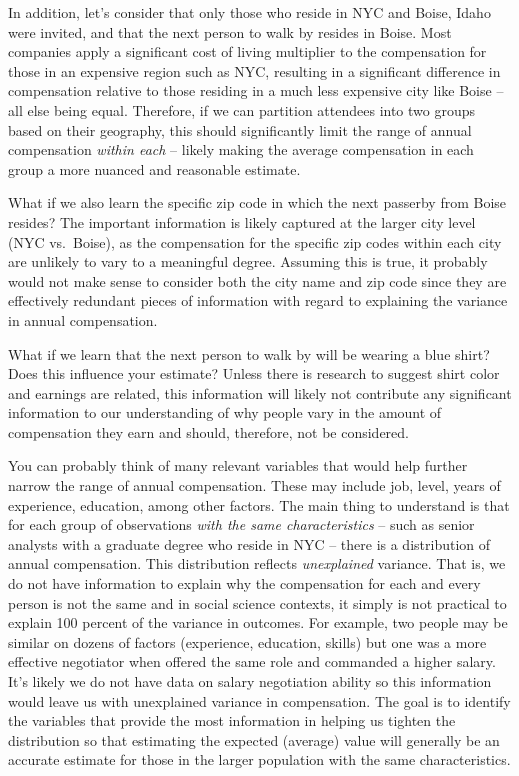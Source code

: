 \documentclass[
]{book}
\begin{document}
In addition, let's consider that only those who reside in NYC and Boise, Idaho were invited, and that the next person to walk by resides in Boise. Most companies apply a significant cost of living multiplier to the compensation for those in an expensive region such as NYC, resulting in a significant difference in compensation relative to those residing in a much less expensive city like Boise -- all else being equal. Therefore, if we can partition attendees into two groups based on their geography, this should significantly limit the range of annual compensation \emph{within each} -- likely making the average compensation in each group a more nuanced and reasonable estimate.

What if we also learn the specific zip code in which the next passerby from Boise resides? The important information is likely captured at the larger city level (NYC vs.~Boise), as the compensation for the specific zip codes within each city are unlikely to vary to a meaningful degree. Assuming this is true, it probably would not make sense to consider both the city name and zip code since they are effectively redundant pieces of information with regard to explaining the variance in annual compensation.

What if we learn that the next person to walk by will be wearing a blue shirt? Does this influence your estimate? Unless there is research to suggest shirt color and earnings are related, this information will likely not contribute any significant information to our understanding of why people vary in the amount of compensation they earn and should, therefore, not be considered.

You can probably think of many relevant variables that would help further narrow the range of annual compensation. These may include job, level, years of experience, education, among other factors. The main thing to understand is that for each group of observations \emph{with the same characteristics} -- such as senior analysts with a graduate degree who reside in NYC -- there is a distribution of annual compensation. This distribution reflects \emph{unexplained} variance. That is, we do not have information to explain why the compensation for each and every person is not the same and in social science contexts, it simply is not practical to explain 100 percent of the variance in outcomes. For example, two people may be similar on dozens of factors (experience, education, skills) but one was a more effective negotiator when offered the same role and commanded a higher salary. It's likely we do not have data on salary negotiation ability so this information would leave us with unexplained variance in compensation. The goal is to identify the variables that provide the most information in helping us tighten the distribution so that estimating the expected (average) value will generally be an accurate estimate for those in the larger population with the same characteristics.
\end{document}
